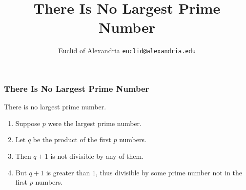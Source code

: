 \documentclass[aspectratio=169,10pt,handout]{beamer}
\title{There Is No Largest Prime Number}
\author[Euclid]{Euclid of Alexandria \texttt{euclid@alexandria.edu}}
\begin{document}
   \maketitle

\begin{frame} 
\frametitle{There Is No Largest Prime Number} 
\begin{theorem}
There is no largest prime number. 
\end{theorem} 
\begin{enumerate} 
\item Suppose $p$ were the largest prime number. 
\item Let $q$ be the product of the first $p$ numbers. 
\item Then $q+1$ is not divisible by any of them. 
\item But $q + 1$ is greater than $1$, thus divisible by some prime
number not in the first $p$ numbers.
\end{enumerate}
\end{frame}
% 
\end{document}
